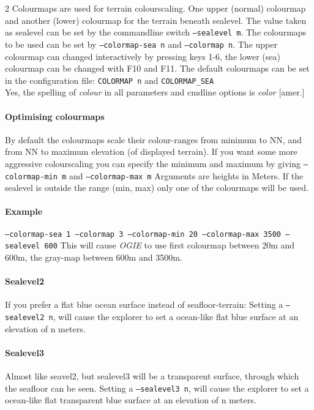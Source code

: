 2 Colourmaps are used for terrain colourscaling. One upper (normal) colourmap and another (lower) colourmap for the terrain beneath sealevel. The value taken as sealevel can be set by the commandline switch \texttt{--sealevel m}. The colourmaps to be used can be set by \texttt{--colormap-sea n} and \texttt{--colormap n}. The upper colourmap can changed interactively by pressing keys 1-6, the lower (sea) colourmap can be changed with F10 and F11.
The default colourmaps can be set in the configuration file:
\texttt{COLORMAP n} and \texttt{COLORMAP\_SEA}
\\
Yes, the spelling of \emph{colour} in all parameters and cmdline options is \emph{color} [amer.]

\paragraph{Optimising colourmaps}
By default the colourmaps scale their colour-ranges from minimum to NN,
and from NN to maximum elevation (of displayed terrain).
If you want some more aggressive colourscaling you can
specify the minimum and maximum by giving \texttt{--colormap-min m} and \texttt{--colormap-max m}
Arguments are heights in Meters.
If the sealevel is outside the range (min, max) only one of the colourmaps will
be used.

\paragraph{Example}
\texttt{--colormap-sea 1 --colormap 3 --colormap-min 20 --colormap-max 3500 --sealevel 600}
This will cause \emph{OGIE} to use first colourmap between 20m and 600m, the gray-map between 600m and 3500m.

\paragraph{Sealevel2}
If you prefer a flat blue ocean surface instead of seafloor-terrain:
Setting a \texttt{--sealevel2 n}, will cause the explorer to set a ocean-like flat blue
surface at an elevation of n meters.

\paragraph{Sealevel3}
Almost like seavel2, but sealevel3 will be a transparent surface, through which the seafloor can be seen.
Setting a \texttt{--sealevel3 n}, will cause the explorer to set a ocean-like flat transparent blue
surface at an elevation of n meters.




